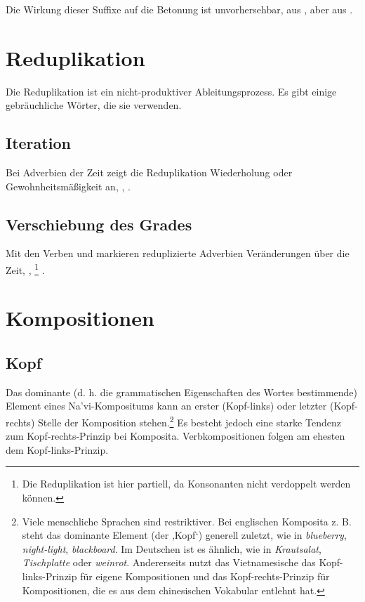 \subsubsection{} Die Wirkung dieser Suffixe auf die Betonung ist unvorhersehbar,   aus  , aber   aus  .

\section{Reduplikation}
\noindent Die Reduplikation ist ein nicht-produktiver Ableitungsprozess. Es gibt einige gebräuchliche Wörter, die sie verwenden. 

\subsection{Iteration} Bei Adverbien der Zeit zeigt die Reduplikation Wiederholung oder Gewohnheitsmäßigkeit an,  ,  .

\subsection{Verschiebung des Grades} Mit den Verben   und   markieren reduplizierte Adverbien Veränderungen über die Zeit,  , \footnote{Die Reduplikation ist hier partiell, da Konsonanten nicht verdoppelt werden können.} .

\section{Kompositionen}

\subsection{Kopf} Das dominante (d. h. die grammatischen Eigenschaften des Wortes bestimmende) Element eines Na'vi-Kompositums kann an erster (Kopf-links) oder letzter (Kopf-rechts) Stelle der Komposition stehen.\footnote{Viele menschliche Sprachen sind restriktiver. Bei englischen Komposita z. B. steht das dominante Element (der ,Kopf‘) generell zuletzt, wie in \textit{blueberry}, \textit{night-light}, \textit{blackboard}. Im Deutschen ist es ähnlich, wie in \textit{Krautsalat}, \textit{Tischplatte} oder \textit{weinrot}. Andererseits nutzt das Vietnamesische das Kopf-links-Prinzip für eigene Kompositionen und das Kopf-rechts-Prinzip für Kompositionen, die es aus dem chinesischen Vokabular entlehnt hat.} Es besteht jedoch eine starke Tendenz zum Kopf-rechts-Prinzip bei Komposita. Verbkompositionen folgen am ehesten dem Kopf-links-Prinzip.

